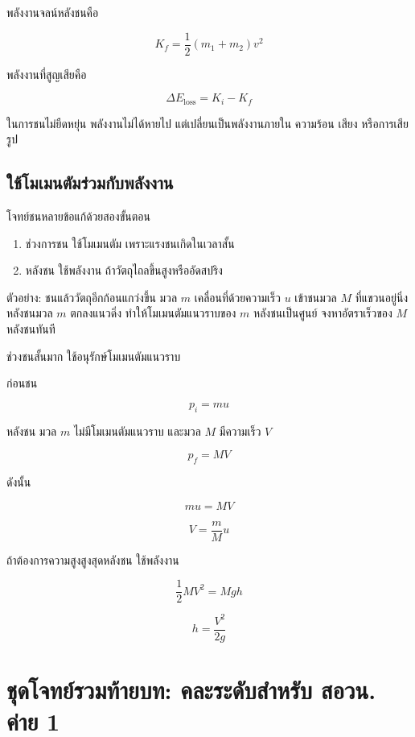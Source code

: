 พลังงานจลน์หลังชนคือ

\[
K_f=\frac{1}{2}(m_1+m_2)v^2
\]

พลังงานที่สูญเสียคือ

\[
\Delta E_{\text{loss}}=K_i-K_f
\]

\begin{tcolorbox}[title=ข้อควรจำ]
ในการชนไม่ยืดหยุ่น พลังงานไม่ได้หายไป แต่เปลี่ยนเป็นพลังงานภายใน ความร้อน เสียง หรือการเสียรูป
\end{tcolorbox}

\subsection{ใช้โมเมนตัมร่วมกับพลังงาน}

โจทย์ชนหลายข้อแก้ด้วยสองขั้นตอน

\begin{enumerate}
    \item ช่วงการชน ใช้โมเมนตัม เพราะแรงชนเกิดในเวลาสั้น
    \item หลังชน ใช้พลังงาน ถ้าวัตถุไถลขึ้นสูงหรืออัดสปริง
\end{enumerate}

\begin{examplebox}{ตัวอย่าง: ชนแล้ววัตถุอีกก้อนแกว่งขึ้น}
มวล $m$ เคลื่อนที่ด้วยความเร็ว $u$ เข้าชนมวล $M$ ที่แขวนอยู่นิ่ง หลังชนมวล $m$ ตกลงแนวดิ่ง ทำให้โมเมนตัมแนวราบของ $m$ หลังชนเป็นศูนย์ จงหาอัตราเร็วของ $M$ หลังชนทันที

ช่วงชนสั้นมาก ใช้อนุรักษ์โมเมนตัมแนวราบ

ก่อนชน

\[
p_i=mu
\]

หลังชน มวล $m$ ไม่มีโมเมนตัมแนวราบ และมวล $M$ มีความเร็ว $V$

\[
p_f=MV
\]

ดังนั้น

\[
mu=MV
\]

\[
\boxed{V=\frac{m}{M}u}
\]

ถ้าต้องการความสูงสูงสุดหลังชน ใช้พลังงาน

\[
\frac{1}{2}MV^2=Mgh
\]

\[
h=\frac{V^2}{2g}
\]
\end{examplebox}

\section{ชุดโจทย์รวมท้ายบท: คละระดับสำหรับ สอวน. ค่าย 1}

